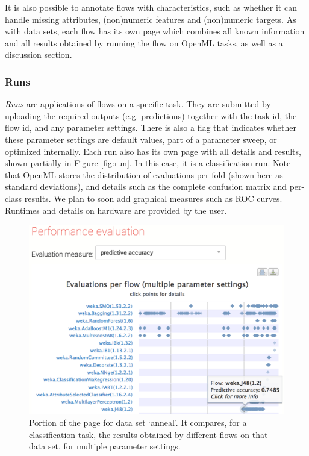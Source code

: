 \documentclass{acmproc-sp}
\begin{document}
It is also possible to annotate flows with characteristics, such as whether it can handle missing attributes, (non)numeric features and (non)numeric targets. As with data sets, each flow has its own page which combines all known information and all results obtained by running the flow on OpenML tasks, as well as a discussion section.

\subsubsection{Runs}
\textit{Runs} are applications of flows on a specific task. They are submitted by uploading the required outputs (e.g. predictions) together with the task id, the flow id, and any parameter settings. There is also a flag that indicates whether these parameter settings are default values, part of a parameter sweep, or optimized internally. Each run also has its own page with all details and results, shown partially in Figure \ref{fig:run}. In this case, it is a classification run. Note that OpenML stores the distribution of evaluations per fold (shown here as standard deviations), and details such as the complete confusion matrix and per-class results. We plan to soon add graphical measures such as ROC curves. Runtimes and details on hardware are provided by the user. 

\begin{figure}
\centering
\includegraphics[width=\columnwidth]{openml-datacompare.png}
\caption{\label{fig:datacompare} Portion of the page for data set `anneal'. It compares, for a classification task, the results obtained by different flows on that data set, for multiple parameter settings.}
\end{figure}
\end{document}
